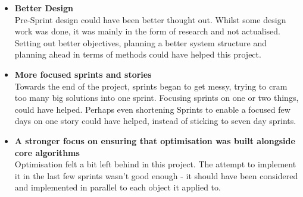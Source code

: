 \documentclass[a4paper,10pt]{report}
\begin{document}
\begin{itemize}
    \item \textbf{Better Design} \\
    Pre-Sprint design could have been better thought out. Whilst some design work was done, it was mainly in the form of research and not actualised. Setting out better objectives, planning a better system structure and planning ahead in terms of methods could have helped this project.
    
    \item \textbf{More focused sprints and stories}\\
    Towards the end of the project, sprints began to get messy, trying to cram too many big solutions into one sprint. Focusing sprints on one or two things, could have helped. Perhaps even shortening Sprints to enable a focused few days on one story could have helped, instead of sticking to seven day sprints. 
    
    \item\textbf{ A stronger focus on ensuring that optimisation was built alongside core algorithms} \\
    Optimisation felt a bit left behind in this project. The attempt to implement it in the last few sprints wasn't good enough - it should have been considered and implemented in parallel to each object it applied to. 
\end{itemize}
  
\end{document}

